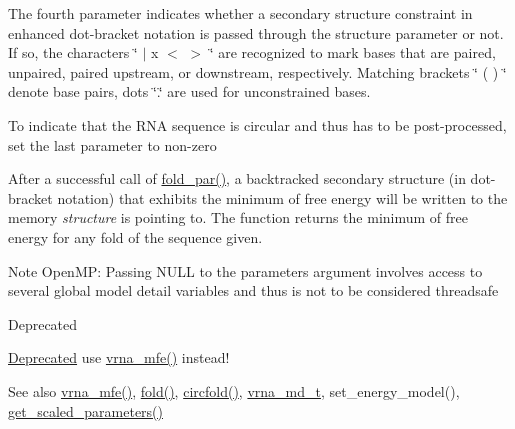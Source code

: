 The fourth parameter indicates whether a secondary structure constraint in enhanced dot-\/bracket notation is passed through the structure parameter or not. If so, the characters \char`\"{} $\vert$ x $<$ $>$ \char`\"{} are recognized to mark bases that are paired, unpaired, paired upstream, or downstream, respectively. Matching brackets \char`\"{} ( ) \char`\"{} denote base pairs, dots \char`\"{}.\char`\"{} are used for unconstrained bases.

To indicate that the R\+N\+A sequence is circular and thus has to be post-\/processed, set the last parameter to non-\/zero

After a successful call of \hyperlink{group__mfe__fold__single_ga2bc41df5d71fee6fd8da9904ee65d8fb}{fold\+\_\+par()}, a backtracked secondary structure (in dot-\/bracket notation) that exhibits the minimum of free energy will be written to the memory {\itshape structure} is pointing to. The function returns the minimum of free energy for any fold of the sequence given.

\begin{DoxyNote}{Note}
Open\+M\+P\+: Passing N\+U\+L\+L to the \textquotesingle{}parameters\textquotesingle{} argument involves access to several global model detail variables and thus is not to be considered threadsafe
\end{DoxyNote}
\begin{DoxyRefDesc}{Deprecated}
\item[\hyperlink{deprecated__deprecated000070}{Deprecated}]use \hyperlink{group__mfe__fold_gabd3b147371ccf25c577f88bbbaf159fd}{vrna\+\_\+mfe()} instead!\end{DoxyRefDesc}


\begin{DoxySeeAlso}{See also}
\hyperlink{group__mfe__fold_gabd3b147371ccf25c577f88bbbaf159fd}{vrna\+\_\+mfe()}, \hyperlink{group__mfe__fold__single_gaadafcb0f140795ae62e5ca027e335a9b}{fold()}, \hyperlink{group__mfe__fold__single_ga4ac63ab3e8d9a80ced28b8052d94e423}{circfold()}, \hyperlink{group__model__details_ga1f8a10e12a0a1915f2a4eff0b28ea17c}{vrna\+\_\+md\+\_\+t}, set\+\_\+energy\+\_\+model(), \hyperlink{group__energy__parameters_ga7fa6a000d7c16feab939f2c4ee626197}{get\+\_\+scaled\+\_\+parameters()}
\end{DoxySeeAlso}


